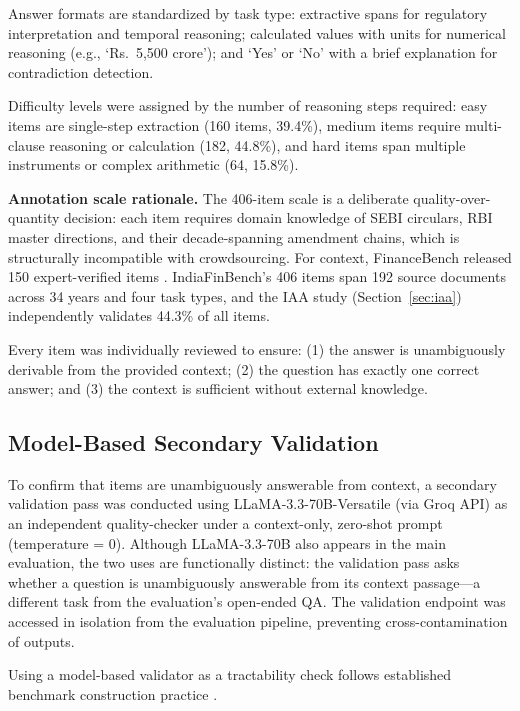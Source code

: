 \documentclass[11pt]{article}
\begin{document}
Answer formats are standardized by task type: extractive spans for regulatory interpretation and temporal reasoning; calculated values with units for numerical reasoning (e.g., `Rs.~5,500 crore'); and `Yes' or `No' with a brief explanation for contradiction detection.

Difficulty levels were assigned by the number of reasoning steps required: easy items are single-step extraction (160 items, 39.4\%), medium items require multi-clause reasoning or calculation (182, 44.8\%), and hard items span multiple instruments or complex arithmetic (64, 15.8\%).

\textbf{Annotation scale rationale.} The 406-item scale is a deliberate quality-over-quantity decision: each item requires domain knowledge of SEBI circulars, RBI master directions, and their decade-spanning amendment chains, which is structurally incompatible with crowdsourcing. For context, FinanceBench released 150 expert-verified items \citep{islam2023financebench}. IndiaFinBench's 406 items span 192 source documents across 34 years and four task types, and the IAA study (Section~\ref{sec:iaa}) independently validates 44.3\% of all items.

Every item was individually reviewed to ensure: (1) the answer is unambiguously derivable from the provided context; (2) the question has exactly one correct answer; and (3) the context is sufficient without external knowledge.

\subsection{Model-Based Secondary Validation}

To confirm that items are unambiguously answerable from context, a secondary validation pass was conducted using LLaMA-3.3-70B-Versatile (via Groq API) as an independent quality-checker under a context-only, zero-shot prompt (temperature = 0). Although LLaMA-3.3-70B also appears in the main evaluation, the two uses are functionally distinct: the validation pass asks whether a question is unambiguously answerable from its context passage---a different task from the evaluation's open-ended QA. The validation endpoint was accessed in isolation from the evaluation pipeline, preventing cross-contamination of outputs.

Using a model-based validator as a tractability check follows established benchmark construction practice \citep{islam2023financebench, hendrycks2021cuad}.
\end{document}
